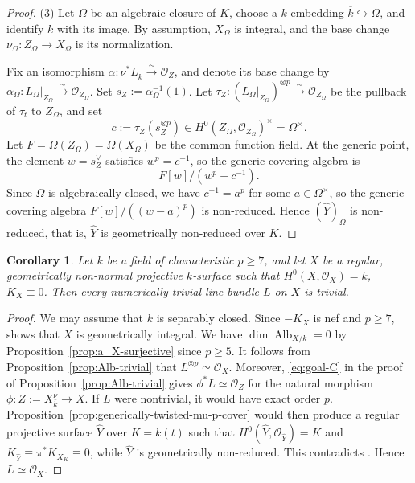\documentclass[10pt,abstract=true]{scrartcl}
\numberwithin{equation}{section}
\newtheorem{corollary}[theorem]{Corollary}
\theoremstyle{definition}
\theoremstyle{remark}
\DeclareMathOperator\Alb{Alb}
\begin{document}
\begin{proof}
  \smallskip
  (3) Let $\Omega$ be an algebraic closure of $K$, choose a $k$-embedding $\overline{k}\hookrightarrow\Omega$, and identify $\overline{k}$ with its image.
  By assumption, $X_\Omega$ is integral, and the base change $\nu_\Omega\colon Z_\Omega\to X_\Omega$ is its normalization.

  Fix an isomorphism $\alpha\colon\nu^*L_{\overline{k}}\xrightarrow{\sim}\mathcal O_Z$, and denote its base change by $\alpha_\Omega\colon L_\Omega|_{Z_\Omega}\xrightarrow{\sim}\mathcal O_{Z_\Omega}$.
  Set $s_Z:=\alpha_\Omega^{-1}(1)$.
  Let $\tau_Z\colon(L_\Omega|_{Z_\Omega})^{\otimes p}\xrightarrow{\sim}\mathcal O_{Z_\Omega}$ be the pullback of $\tau_t$ to $Z_\Omega$, and set
  \[
    c:=\tau_Z(s_Z^{\otimes p}) \in H^0(Z_\Omega,\mathcal O_{Z_\Omega})^\times =\Omega^\times.
  \]
  Let $F=\Omega(Z_\Omega)=\Omega(X_\Omega)$ be the common function field.
  At the generic point, the element $w=s_Z^\vee$ satisfies $w^p=c^{-1}$, so the generic covering algebra is \[
    F[w]/(w^p-c^{-1}).
  \]
  Since $\Omega$ is algebraically closed, we have $c^{-1}=a^p$ for some $a\in\Omega^\times$, so the generic covering algebra $F[w]/((w-a)^p)$ is non-reduced.
  Hence $(\widehat Y)_\Omega$ is non-reduced, that is, $\widehat Y$ is geometrically non-reduced over $K$.
\end{proof}

\begin{corollary}\label{cor:case-C-p-ge7}
  Let $k$ be a field of characteristic $p\ge7$, and let $X$ be a regular, geometrically non-normal projective $k$-surface such that $H^0(X,\mathcal O_X)=k$, $K_X\equiv0$. 
  Then every numerically trivial line bundle $L$ on $X$ is trivial.
\end{corollary}

\begin{proof}
  We may assume that $k$ is separably closed.
  Since $-K_X$ is nef and $p\ge7$, \cite[Theorem~1.2]{WZ26} shows that $X$ is geometrically integral.
  We have $\dim\Alb_{X/k}=0$ by Proposition~\ref{prop:a_X-surjective} since $p\geq5$.
  It follows from Proposition~\ref{prop:Alb-trivial} that $L^{\otimes p}\simeq\mathcal O_X$.
  Moreover, \eqref{eq:goal-C} in the proof of Proposition~\ref{prop:Alb-trivial} gives $\phi^*L\simeq\mathcal O_Z$ for the natural morphism $\phi\colon Z:=X_{\bar k}^\nu\to X$.
  If $L$ were nontrivial, it would have exact order $p$.
  Proposition~\ref{prop:generically-twisted-mu-p-cover} would then produce a regular projective surface $\widehat Y$ over $K=k(t)$ such that $H^0(\widehat Y,\mathcal O_{\widehat Y})=K$
  and $K_{\widehat Y}\equiv\pi^*K_{X_K}\equiv0$, while $\widehat Y$ is geometrically non-reduced.
  This contradicts \cite[Theorem~1.2]{WZ26}.
  Hence $L\simeq\mathcal O_X$.
\end{proof}
\end{document}
